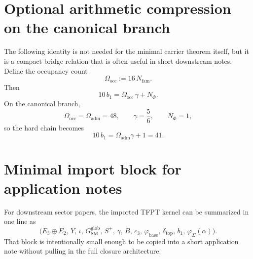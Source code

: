 \documentclass[11pt,a4paper]{article}
\theoremstyle{definition}
\theoremstyle{remark}
\newcommand{\inv}{\iota}
\newcommand{\cthree}{c_3}
\newcommand{\bone}{b_1}
\newcommand{\phibase}{\varphi_{\mathrm{base}}}
\newcommand{\phiseam}{\varphi_{\Sigma}}
\newcommand{\deltatop}{\delta_{\mathrm{top}}}
\newcommand{\gammaY}{\gamma}
\newcommand{\SM}{\mathrm{SM}}
\newcommand{\Oadm}{\Omega_{\mathrm{adm}}}
\numberwithin{equation}{section}
\begin{document}
\appendix

\section{Optional arithmetic compression on the canonical branch}

The following identity is not needed for the minimal carrier theorem itself, but it is a compact
bridge relation that is often useful in short downstream notes. Define the occupancy count
\[
\Omega_{\mathrm{occ}} := 16\,N_{\mathrm{fam}}.
\]
Then
\[
10\,\bone
=
\Omega_{\mathrm{occ}}\,\gammaY + N_\Phi.
\]
On the canonical branch,
\[
\Omega_{\mathrm{occ}} = \Oadm = 48,
\qquad
\gammaY = \frac56,
\qquad
N_\Phi = 1,
\]
so the hard chain becomes
\[
10\,\bone = \Oadm\gammaY + 1 = 41.
\]

\section{Minimal import block for application notes}

For downstream sector papers, the imported TFPT kernel can be summarized in one line as
\[
\bigl(
E_3\oplus E_2,\,
Y,\,
\inv,\,
G_{\SM}^{\mathrm{glob}},\,
S^+,\,
\gammaY,\,
B,\,
\cthree,\,
\phibase,\,
\deltatop,\,
\bone,\,
\phiseam(\alpha)
\bigr).
\]
That block is intentionally small enough to be copied into a short application note without
pulling in the full closure architecture.
\end{document}
